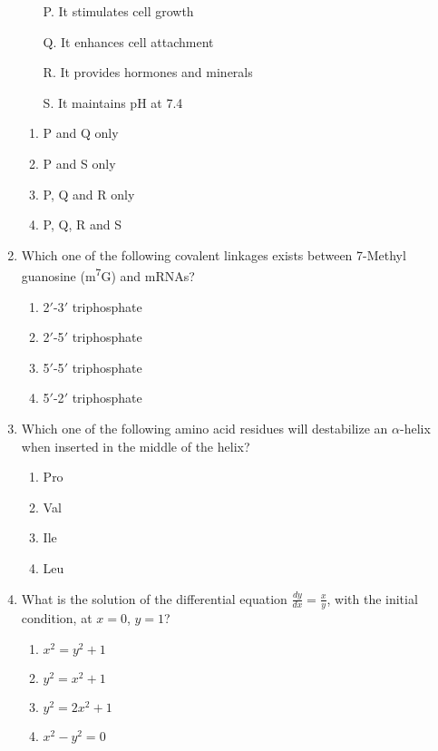 \documentclass[12pt]{article}
\begin{document}
\begin{enumerate}[label=Q.\arabic*,start=26]
		\begin{itemize}
			\item[P.] It stimulates cell growth
			\item[Q.] It enhances cell attachment
			\item[R.] It provides hormones and minerals
			\item[S.] It maintains pH at 7.4
		\end{itemize}

		\begin{enumerate}[label=(\Alph*)]
			\item P and Q only
			\item P and S only
			\item P, Q and R only
			\item P, Q, R and S
		\end{enumerate}

	\item Which one of the following covalent linkages exists between 7-Methyl guanosine (m\textsuperscript{7}G) and mRNAs?
		\begin{enumerate}[label=(\Alph*)]
			\item 2$'$-3$'$ triphosphate
			\item 2$'$-5$'$ triphosphate
			\item 5$'$-5$'$ triphosphate
			\item 5$'$-2$'$ triphosphate
		\end{enumerate}
	\item Which one of the following amino acid residues will destabilize an $\alpha$-helix when inserted in the middle of the helix?
		\begin{enumerate}[label=(\Alph*)]
			\item Pro
			\item Val
			\item Ile
			\item Leu
		\end{enumerate}

	\item What is the solution of the differential equation $\frac{dy}{dx} = \frac{x}{y}$, with the initial condition, at $x = 0$, $y = 1$?
		\begin{enumerate}[label=(\Alph*)]
			\item $x^2 = y^2 + 1$
			\item $y^2 = x^2 + 1$
			\item $y^2 = 2x^2 + 1$
			\item $x^2 - y^2 = 0$
		\end{enumerate}


\end{enumerate}
\end{document}
